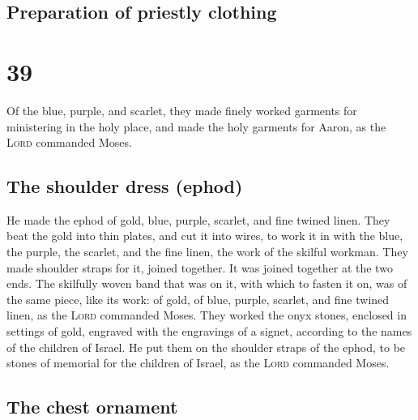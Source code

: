 \hypertarget{preparation-of-priestly-clothing}{%
\subsection{Preparation of priestly
clothing}\label{preparation-of-priestly-clothing}}

\hypertarget{section-38}{%
\section{39}\label{section-38}}

 Of the blue, purple, and scarlet, they made finely worked
garments for ministering in the holy place, and made the holy garments
for Aaron, as the \textsc{Lord} commanded Moses.

\hypertarget{the-shoulder-dress-ephod-1}{%
\subsection{The shoulder dress
(ephod)}\label{the-shoulder-dress-ephod-1}}

 He made the ephod of gold, blue, purple, scarlet, and
fine twined linen.  They beat the gold into thin plates,
and cut it into wires, to work it in with the blue, the purple, the
scarlet, and the fine linen, the work of the skilful workman.
 They made shoulder straps for it, joined together. It was
joined together at the two ends.  The skilfully woven band
that was on it, with which to fasten it on, was of the same piece, like
its work: of gold, of blue, purple, scarlet, and fine twined linen, as
the \textsc{Lord} commanded Moses.  They worked the onyx
stones, enclosed in settings of gold, engraved with the engravings of a
signet, according to the names of the children of Israel. 
He put them on the shoulder straps of the ephod, to be stones of
memorial for the children of Israel, as the \textsc{Lord} commanded
Moses.

\hypertarget{the-chest-ornament}{%
\subsection{The chest ornament}\label{the-chest-ornament}}

